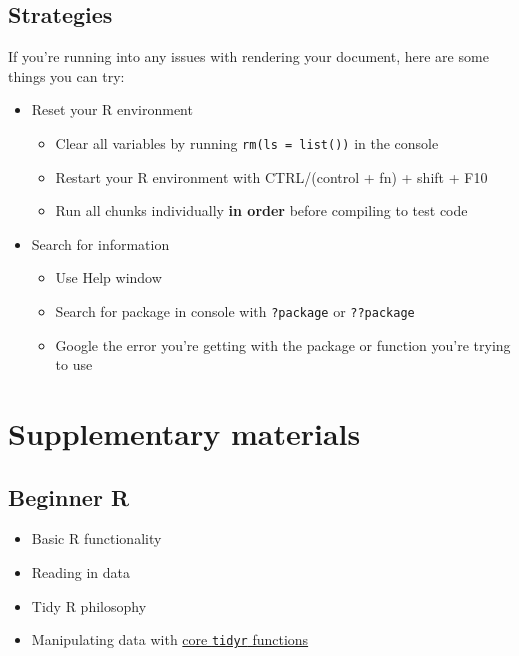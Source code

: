 \documentclass[
  openany]{book}
\providecommand{\tightlist}{%
  \setlength{\itemsep}{0pt}\setlength{\parskip}{0pt}}
\begin{document}
\hypertarget{strategies}{%
\section{Strategies}\label{strategies}}

If you're running into any issues with rendering your document, here are some things you can try:

\begin{itemize}
\tightlist
\item
  Reset your R environment

  \begin{itemize}
  \tightlist
  \item
    Clear all variables by running \texttt{rm(ls\ =\ list())} in the console
  \item
    Restart your R environment with CTRL/(control + fn) + shift + F10
  \item
    Run all chunks individually \textbf{in order} before compiling to test code
  \end{itemize}
\item
  Search for information

  \begin{itemize}
  \tightlist
  \item
    Use Help window
  \item
    Search for package in console with \texttt{?package} or \texttt{??package}
  \item
    Google the error you're getting with the package or function you're trying to use
  \end{itemize}
\end{itemize}

\hypertarget{supplement}{%
\chapter{Supplementary materials}\label{supplement}}

\hypertarget{beginner-r}{%
\section{Beginner R}\label{beginner-r}}

\begin{itemize}
\tightlist
\item
  Basic R functionality
\item
  Reading in data
\item
  Tidy R philosophy
\item
  Manipulating data with \href{https://rstudio.com/wp-content/uploads/2015/02/data-wrangling-cheatsheet.pdf}{core \texttt{tidyr} functions}
\end{itemize}
\end{document}
